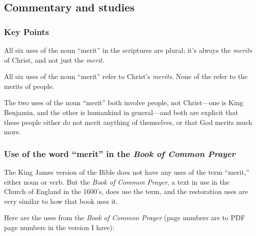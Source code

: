 	
\subsection{Commentary and studies} %
	\label{MERIT-COMMENTARY}

	\subsubsection{Key Points}
		\label{MERIT-KEYs}
	
		\begin{compactitem}
			\item All six uses of the noun ``merit'' in the scriptures are plural; it's always the \textit{merits} of Christ, and not just the \textit{merit}.
			\item All six uses of the noun ``merit'' refer to Christ's \textit{merits}. None of the refer to the merits of people.
				\begin{compactitem}
					\item The two uses of the noun ``merit'' both involve people, not Christ---one is King Benjamin, and the other is humankind in general---and both are explicit that these people either do not merit anything of themselves, or that God merits much more.
				\end{compactitem} 
		\end{compactitem}
		
	\subsubsection{Use of the word ``merit'' in the \textit{Book of Common Prayer}}
		\label{MERIT-common}
		
		The King James version of the Bible does not have any uses of the term ``merit,'' either noun or verb. But the \textit{Book of Common Prayer}, a text in use in the Church of England in the 1600's, does use the term, and the restoration uses are very similar to how that book uses it.
		
		Here are the uses from the \textit{Book of Common Prayer} (page numbers are to PDF page numbers in the version I have):
		
